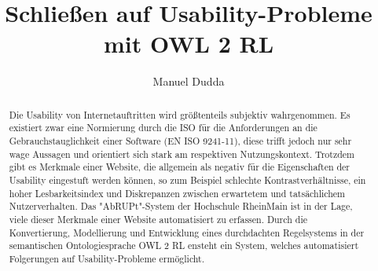 \documentclass[runningheads,a4paper]{llncs}
\begin{document}
\mainmatter  %

\title{Schließen auf Usability-Probleme mit OWL 2 RL}


%
%
\author{Manuel Dudda}
%


%
%

\maketitle

\renewcommand{\abstractname}{Abstract}
\begin{abstract}
Die Usability von Internetauftritten wird größtenteils subjektiv wahrgenommen. 
Es existiert zwar eine Normierung durch die ISO für die Anforderungen an die Gebrauchstauglichkeit einer Software (EN ISO 9241-11), diese trifft jedoch nur sehr wage Aussagen und orientiert sich stark am respektiven Nutzungskontext. 
Trotzdem gibt es Merkmale einer Website, die allgemein als negativ für die Eigenschaften der Usability eingestuft werden können, so zum Beispiel schlechte Kontrastverhältnisse, ein hoher Lesbarkeitsindex und Diskrepanzen zwischen erwartetem und tatsächlichem Nutzerverhalten. 
Das "{}AbRUPt"{}-System der Hochschule RheinMain ist in der Lage, viele dieser Merkmale einer Website automatisiert zu erfassen. 
Durch die Konvertierung, Modellierung und Entwicklung eines durchdachten Regelsystems in der semantischen Ontologiesprache OWL 2 RL ensteht ein System, welches automatisiert Folgerungen auf Usability-Probleme ermöglicht.
\end{abstract}
\end{document}
